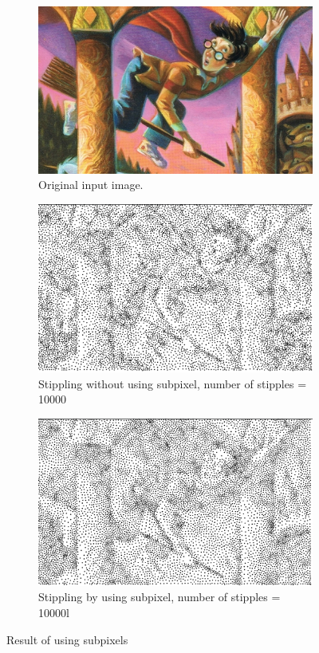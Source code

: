 \documentclass[11pt]{article}
\begin{document}
\begin{figure}[h!]
	\centering
	\begin{subfigure}[b]{0.8\linewidth}
		\includegraphics[width=\linewidth]{harry3.jpg}
		\caption{Original input image.}
	\end{subfigure}
	\begin{subfigure}[b]{0.4\linewidth}
		\includegraphics[width=\linewidth]{harry3-10000_random.png}
		\caption{Stippling without using subpixel, number of stipples = 10000}
	\end{subfigure}
	\begin{subfigure}[b]{0.4\linewidth}
		\includegraphics[width=\linewidth]{harry3-10000_random_sub.png}
		\caption{Stippling by using subpixel, number of stipples = 10000l}
	\end{subfigure}
\caption{Result of using subpixels}
\label{fig:subpixel}
\end{figure}
\end{document}
